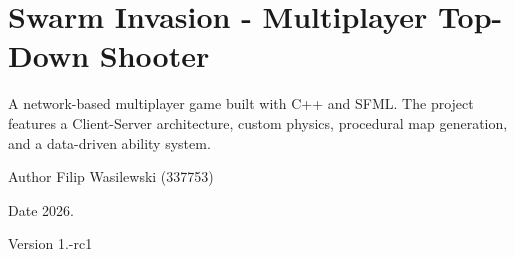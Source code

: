 \chapter{Swarm Invasion -\/ Multiplayer Top-\/\+Down Shooter }
\hypertarget{index}{}\label{index}

\begin{DoxyItemize}
\item A network-\/based multiplayer game built with C++ and SFML. The project features a Client-\/\+Server architecture, custom physics, procedural map generation, and a data-\/driven ability system.
\item \begin{DoxyAuthor}{Author}
Filip Wasilewski (337753) 
\end{DoxyAuthor}
\begin{DoxyDate}{Date}
2026. 
\end{DoxyDate}
\begin{DoxyVersion}{Version}
1.-\/rc1 
\end{DoxyVersion}

\end{DoxyItemize}